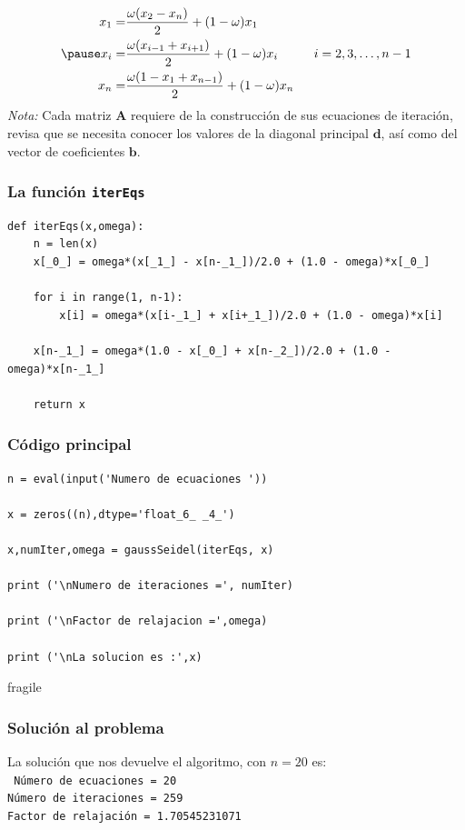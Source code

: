 \begin{frame}
\[ \begin{split}
x_{1} =& \dfrac{\omega(x_{2}-x_{n})}{2} + (1 - \omega)x_{1} \\
\pause
x_{i} =& \dfrac{\omega(x_{i-1}+x_{i+1})}{2} + (1 - \omega)x_{i} \hspace{1cm} i=2,3,\ldots,n-1 \\
x_{n} =& \dfrac{\omega(1-x_{1} + x_{n-1})}{2} + (1-\omega)x_{n}
\end{split} \]
\emph{Nota: } Cada matriz $\mathbf{A}$ requiere de la construcción de sus ecuaciones de iteración, revisa que se necesita conocer los valores de la diagonal principal $\mathbf{d}$, así como del vector de coeficientes $\mathbf{b}$.
\end{frame}
\begin{frame}[fragile]
\frametitle{La función \texttt{iterEqs}}
\begin{lstlisting}[caption=Código para el ejercicio GS, style=FormattedNumber, basicstyle=\linespread{1.1}\ttfamily=\small, columns=fullflexible]
def iterEqs(x,omega):
    n = len(x)
    x[_0_] = omega*(x[_1_] - x[n-_1_])/2.0 + (1.0 - omega)*x[_0_]
    
    for i in range(1, n-1):
        x[i] = omega*(x[i-_1_] + x[i+_1_])/2.0 + (1.0 - omega)*x[i]
    
    x[n-_1_] = omega*(1.0 - x[_0_] + x[n-_2_])/2.0 + (1.0 - omega)*x[n-_1_]

    return x
\end{lstlisting}
\end{frame}
\begin{frame}
\frametitle{Código principal}
\begin{lstlisting}[caption=Código principal, style=FormattedNumber, basicstyle=\linespread{1.1}\ttfamily=\small, columns=fullflexible]
n = eval(input('Numero de ecuaciones '))

x = zeros((n),dtype='float_6_ _4_')

x,numIter,omega = gaussSeidel(iterEqs, x)

print ('\nNumero de iteraciones =', numIter)

print ('\nFactor de relajacion =',omega)

print ('\nLa solucion es :',x)
\end{lstlisting}
\end{frame}
\begin{frame}{fragile}
\frametitle{Solución al problema}
La solución que nos devuelve el algoritmo, con $n=20$ es:
\\
\medskip
\texttt{
Número de ecuaciones = 20 
\\
\medskip
Número de iteraciones = 259 
\\
\medskip
Factor de relajación = 1.70545231071
}
\end{frame}
